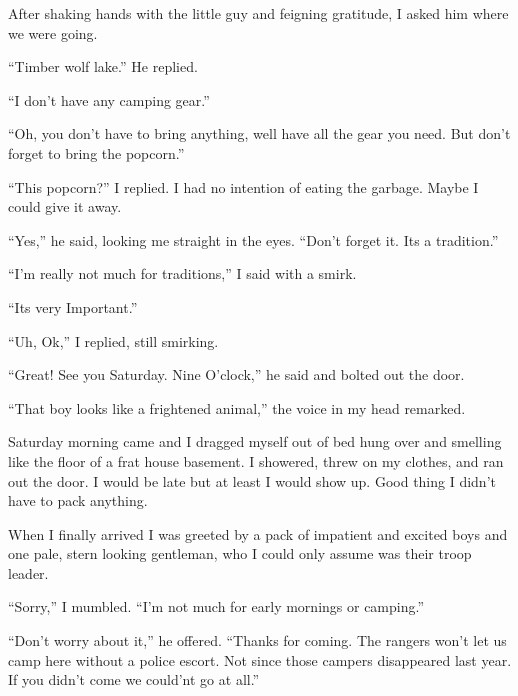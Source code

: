 After shaking hands with the little guy and feigning gratitude, I
asked him where we were going.



``Timber wolf lake.'' He replied.



``I don't have any camping gear.''



``Oh, you don't have to bring anything, well have all the gear you
need. But don't forget to bring the popcorn.''



``This popcorn?'' I replied. I had no intention of eating the
garbage. Maybe I could give it away.



``Yes,'' he said, looking me straight in the eyes. ``Don't forget it.
Its a tradition.''



``I'm really not much for traditions,'' I said with a smirk.



``Its very Important.''



``Uh, Ok,'' I replied, still smirking.



``Great! See you Saturday. Nine O'clock,'' he said and bolted out the
door.

``That boy looks like a frightened animal,'' the voice in my head
remarked.



Saturday morning came and I dragged myself out of bed hung over and
smelling like the floor of a frat house basement. I showered, threw
on my clothes, and ran out the door. I would be late but at least I
would show up. Good thing I didn't have to pack anything.



When I finally arrived I was greeted by a pack of impatient and
excited boys and one pale, stern looking gentleman, who I could
only assume was their troop leader.



``Sorry,'' I mumbled. ``I'm not much for early mornings or
camping.''



``Don't worry about it,'' he offered. ``Thanks for coming. The rangers
won't let us camp here without a police escort. Not since those
campers disappeared last year. If you didn't come we could'nt go at
all.''



